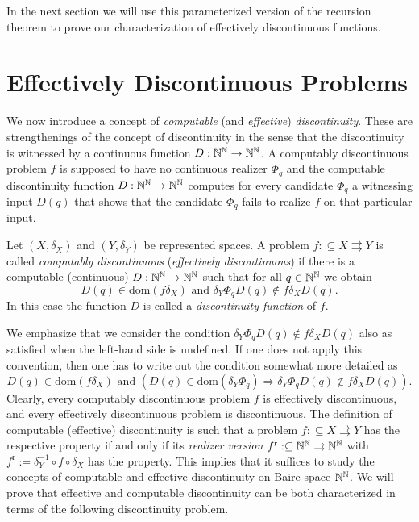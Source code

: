 \documentclass{amsart}
\def\IN{{\Bbb{N}}}
\def\TO{\Longrightarrow}
\def\In{\subseteq}
\def\mto{\rightrightarrows}
\def\dom{{\mathrm{dom}}}
\begin{document}
In the next section we will use this parameterized version of the recursion theorem to prove our characterization of
effectively discontinuous functions.


\section{Effectively Discontinuous Problems}
\label{sec:effective-discontinuity}

We now introduce a concept of {\em computable} (and {\em effective}) {\em discontinuity}. 
These are strengthenings of the concept of discontinuity in the sense that the discontinuity is witnessed by
a continuous function $D:\IN^\IN\to\IN^\IN$. 
A computably discontinuous problem $f$ is supposed to have no continuous realizer $\Phi_q$ and the computable discontinuity function $D:\IN^\IN\to\IN^\IN$
computes for every candidate $\Phi_q$ a witnessing input $D(q)$ that shows that the candidate $\Phi_q$ fails to realize $f$ on that particular input.

\begin{definition}
\label{def:computable-discontinuity}
Let $(X,\delta_X)$ and $(Y,\delta_Y)$ be represented spaces.
A problem $f:\In X\mto Y$ is called {\em computably discontinuous} ({\em effectively discontinuous}) if there is a computable (continuous) $D:\IN^\IN\to\IN^\IN$ such that for all $q\in\IN^\IN$ we obtain
\[D(q)\in\dom(f\delta_X)\mbox{ and }\delta_Y\Phi_qD(q)\not\in f\delta_XD(q).\]
In this case the function $D$ is called a {\em discontinuity function} of $f$.
\end{definition}

We emphasize that we consider the condition $\delta_Y\Phi_qD(q)\not\in f\delta_XD(q)$ also as satisfied when the left-hand side is undefined. 
If one does not apply this convention, then one has to write out the condition somewhat more detailed as 
\[D(q)\in\dom(f\delta_X)\mbox{ and }(D(q)\in\dom(\delta_Y\Phi_q)\TO\delta_Y\Phi_qD(q)\not\in f\delta_XD(q)).\]
Clearly, every computably discontinuous problem $f$ is effectively discontinuous, and every
effectively discontinuous problem is discontinuous.
The definition of computable (effective) discontinuity is such that a problem $f:\In X\mto Y$ has the respective
property if and only if its {\em realizer version} $f^{\mathrm r}:\In\IN^\IN\mto\IN^\IN$ with $f^{\mathrm r}:=\delta_Y^{-1}\circ f\circ\delta_X$ 
has the property. This implies that it suffices to study the concepts of computable and effective discontinuity on Baire space $\IN^\IN$.
We will prove that effective and computable discontinuity can be both characterized in terms of the following
discontinuity problem.
\end{document}
